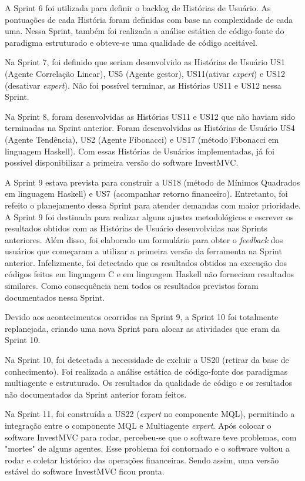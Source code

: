 A Sprint 6 foi utilizada para definir o backlog de Histórias de Usuário. As pontuações de cada História foram definidas com base na complexidade de cada uma. Nessa Sprint, também foi realizada a análise estática de código-fonte do paradigma estruturado e obteve-se uma qualidade de código aceitável.

Na Sprint 7, foi definido que seriam desenvolvido as Histórias de Usuário US1 (Agente Correlação Linear), US5 (Agente gestor), US11(ativar \textit{expert}) e US12 (desativar \textit{expert}). Não foi possível terminar, as Histórias US11 e US12 nessa Sprint.

Na Sprint 8, foram desenvolvidas as Histórias US11 e US12 que não haviam sido terminadas na Sprint anterior. Foram desenvolvidas as Histórias de Usuário US4 (Agente Tendência), US2 (Agente Fibonacci) e US17 (método Fibonacci em linguagem Haskell). Com essas Histórias de Usuários implementadas, já foi possível disponibilizar a primeira versão do software InvestMVC.

A Sprint 9 estava prevista para construir a US18 (método de Mínimos Quadrados em linguagem Haskell) e US7 (acompanhar retorno financeiro). Entretanto, foi refeito o planejamento dessa Sprint para atender demandas com maior prioridade. A Sprint 9 foi destinada para realizar alguns ajustes metodológicos e escrever os resultados obtidos com as Histórias de Usuário desenvolvidas nas Sprints anteriores. Além disso, foi elaborado um formulário para obter o \textit{feedback} dos usuários que começaram a utilizar a primeira versão da ferramenta na Sprint anterior. Infelizmente, foi detectado que os resultados obtidos na execução dos códigos feitos em linguagem C e em linguagem Haskell não forneciam resultados similares. Como consequência nem todos os resultados previstos foram documentados nessa Sprint.

Devido aos acontecimentos ocorridos na Sprint 9, a Sprint 10 foi totalmente replanejada, criando uma nova Sprint para alocar as atividades que eram da Sprint 10.

Na Sprint 10, foi detectada a necessidade de excluir a US20 (retirar da base de conhecimento). Foi realizada a análise estática de código-fonte dos paradigmas multiagente e estruturado. Os resultados da qualidade de código e os resultados não documentados da Sprint anterior foram feitos.

Na Sprint 11, foi construída a US22 (\textit{expert} no componente MQL), permitindo a integração entre o componente MQL e Multiagente \textit{expert}. Após colocar o software InvestMVC para rodar, percebeu-se que o software teve problemas, com "mortes" de alguns agentes. Esse problema foi contornado e o software voltou a rodar e coletar histórico das operações financeiras. Sendo assim, uma versão estável do software InvestMVC ficou pronta.

